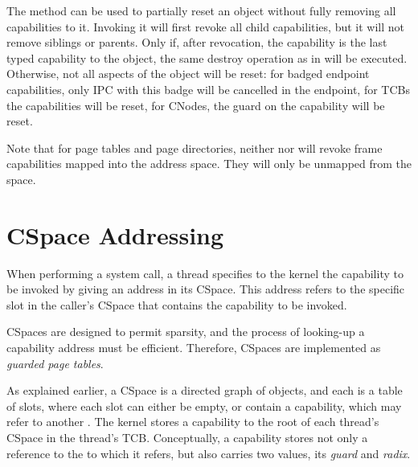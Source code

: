 The  method can be used
to partially reset an object without fully removing all capabilities
to it. Invoking it will first revoke all child capabilities, but it
will not remove siblings or parents. Only if, after revocation, the
capability is the last typed capability to the object, the same
destroy operation as in 
will be executed. Otherwise, not all aspects of the object will be
reset: for badged endpoint capabilities, only IPC with this badge will
be cancelled in the endpoint, for TCBs the capabilities will be reset,
for CNodes, the guard on the capability will be reset.

Note that for page tables and page directories, neither
 nor
 will revoke frame
capabilities mapped into the address space.  They will only be
unmapped from the space.


\section{CSpace Addressing}
\label{s:cspace-addressing}

When performing a system call, a thread specifies to the kernel the
capability to be invoked by giving an address in its CSpace. This
address refers to the specific slot in the caller's CSpace that
contains the capability to be invoked.

CSpaces are designed to permit sparsity, and the process of looking-up
a capability address must be efficient. Therefore, CSpaces are
implemented as \emph{guarded page tables}.

As explained earlier, a CSpace is a directed graph of 
objects, and each  is a table of slots, where each slot can
either be empty, or contain a capability, which may refer to another .
The kernel stores a capability to the root  of each thread's
CSpace in the thread's TCB. Conceptually, a  capability
stores not only a reference to the  to which it refers, but
also carries two values, its \emph{guard} and \emph{radix}.

